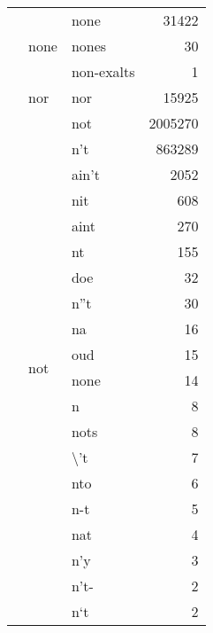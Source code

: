 \begin{longtable}[ht]{lllr}
\cline{2-4}
 & \multirow[c]{3}{*}{none} & none & {\cellcolor[HTML]{FDFED4}} \color[HTML]{000000} 31422 \\
 &  & nones & {\cellcolor[HTML]{FFFFD9}} \color[HTML]{000000} 30 \\
 &  & non-exalts & {\cellcolor[HTML]{FFFFD9}} \color[HTML]{000000} 1 \\
\cline{2-4}
 & nor & nor & {\cellcolor[HTML]{FEFFD6}} \color[HTML]{000000} 15925 \\
\cline{2-4}
 & \multirow[c]{30}{*}{not} & not & {\cellcolor[HTML]{081D58}} \color[HTML]{F1F1F1} 2005270 \\
 &  & n't & {\cellcolor[HTML]{63C3BF}} \color[HTML]{000000} 863289 \\
 &  & ain't & {\cellcolor[HTML]{FFFFD9}} \color[HTML]{000000} 2052 \\
 &  & nit & {\cellcolor[HTML]{FFFFD9}} \color[HTML]{000000} 608 \\
 &  & aint & {\cellcolor[HTML]{FFFFD9}} \color[HTML]{000000} 270 \\
 &  & nt & {\cellcolor[HTML]{FFFFD9}} \color[HTML]{000000} 155 \\
 &  & doe & {\cellcolor[HTML]{FFFFD9}} \color[HTML]{000000} 32 \\
 &  & n''t & {\cellcolor[HTML]{FFFFD9}} \color[HTML]{000000} 30 \\
 &  & na & {\cellcolor[HTML]{FFFFD9}} \color[HTML]{000000} 16 \\
 &  & oud & {\cellcolor[HTML]{FFFFD9}} \color[HTML]{000000} 15 \\
 &  & none & {\cellcolor[HTML]{FFFFD9}} \color[HTML]{000000} 14 \\
 &  & n & {\cellcolor[HTML]{FFFFD9}} \color[HTML]{000000} 8 \\
 &  & nots & {\cellcolor[HTML]{FFFFD9}} \color[HTML]{000000} 8 \\
 &  & \textbackslash 't & {\cellcolor[HTML]{FFFFD9}} \color[HTML]{000000} 7 \\
 &  & nto & {\cellcolor[HTML]{FFFFD9}} \color[HTML]{000000} 6 \\
 &  & n-t & {\cellcolor[HTML]{FFFFD9}} \color[HTML]{000000} 5 \\
 &  & nat & {\cellcolor[HTML]{FFFFD9}} \color[HTML]{000000} 4 \\
 &  & n'y & {\cellcolor[HTML]{FFFFD9}} \color[HTML]{000000} 3 \\
 &  & n't- & {\cellcolor[HTML]{FFFFD9}} \color[HTML]{000000} 2 \\
 &  & n`t & {\cellcolor[HTML]{FFFFD9}} \color[HTML]{000000} 2 \\

\end{longtable}
